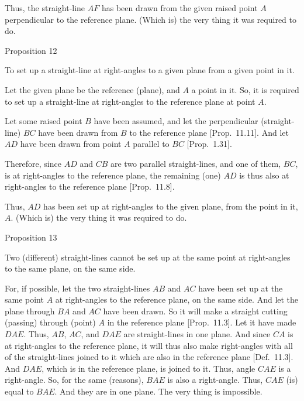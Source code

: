 Thus, the  straight-line $AF$ has been drawn from the given raised point 
$A$ perpendicular to the reference plane. (Which is) the very thing it was required to do.


\begin{center}
{\large Proposition 12}
\end{center}

To set up a straight-line at right-angles to a given plane from a given point in it.

\epsfysize=2.75in
\centerline{}

Let the given plane be the reference (plane), and $A$ a point in it. So, it is required to set up a straight-line at right-angles to the reference plane at point $A$.

Let some raised point $B$ have been assumed, and let the perpendicular
(straight-line) $BC$ have been drawn from $B$ to the reference plane
[Prop.~11.11]. And let $AD$ have been drawn
from point $A$ parallel to $BC$ [Prop.~1.31].

Therefore, since $AD$ and $CB$ are two parallel straight-lines, and one of
them, $BC$, is at right-angles to the reference plane, the remaining (one) $AD$
is thus also at right-angles to the reference plane [Prop.~11.8].

Thus, $AD$ has been set up at right-angles to the given plane, from the
 point in it, $A$. (Which is) the very thing it was required to do.


\begin{center}
{\large Proposition 13}
\end{center}

Two (different) straight-lines cannot be set up at the same point at right-angles to the same plane, on the same side.

\epsfysize=2.5in
\centerline{}

For, if possible, let the two straight-lines $AB$ and $AC$ have been
set up at the same point $A$ at right-angles to the reference plane, on the same
side. And let the plane through $BA$ and $AC$ have been drawn. So
it will make a straight cutting (passing) through (point) $A$ in the reference plane [Prop.~11.3]. Let it have made $DAE$. Thus, $AB$,
$AC$, and $DAE$ are straight-lines in one plane. And
since $CA$ is at right-angles to the reference plane, it will thus
also make right-angles with all of the straight-lines  joined to it which are
also in the reference plane [Def.~11.3]. 
And $DAE$, which is in the reference plane, is joined to it. Thus, angle
$CAE$ is a right-angle. So, for the same (reasons), $BAE$ is also
a right-angle. Thus, $CAE$ (is) equal to  $BAE$. And they are in one
plane. The very thing is impossible.

